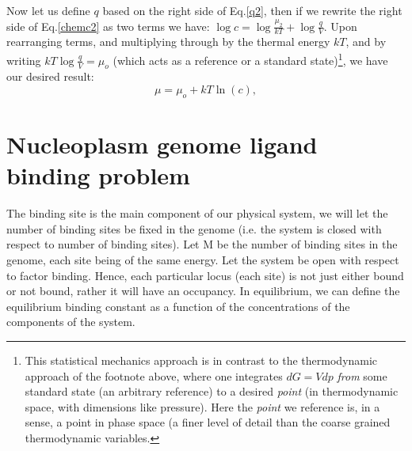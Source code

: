 Now let us define $q$ based on the right side of Eq.\ref{q2}, then if we rewrite the right side of Eq.\ref{chemc2} as two terms we have: $\log{c} =\log{\frac{ \mu_{2}}{kT} }  + \log{ \frac{ q}{V } }$.  Upon rearranging terms, and multiplying through by the thermal energy $kT$, and by writing $kT\log{ \frac{ q}{V } }=\mu_o$ (which acts as a reference or a standard state)\footnote{This statistical mechanics approach is in contrast to the thermodynamic approach of the footnote above, where one integrates $dG=Vdp$ \textit{from} some standard state (an arbitrary reference) to a desired \textit{point} (in thermodynamic space, with dimensions like pressure).  Here the \textit{point} we reference is, in a sense, a point in phase space (a finer level of detail than the coarse grained thermodynamic variables.}, we have our desired result:
\begin{equation}
\mu=\mu_o + kT\ln{(c)},
\end{equation}

\section*{Nucleoplasm genome ligand binding problem}

The binding site is the main component of our physical system, we will let the number of binding sites be fixed in the genome (i.e. the system is closed with respect to number of binding sites).  Let M be the number of binding sites in the genome, each site being of the same energy.  Let the system be open with respect to factor binding. Hence, each particular locus (each site) is not just either bound or not bound, rather it will have an occupancy.  In equilibrium, we can define the equilibrium binding constant as a function of the concentrations of the components of the system.

